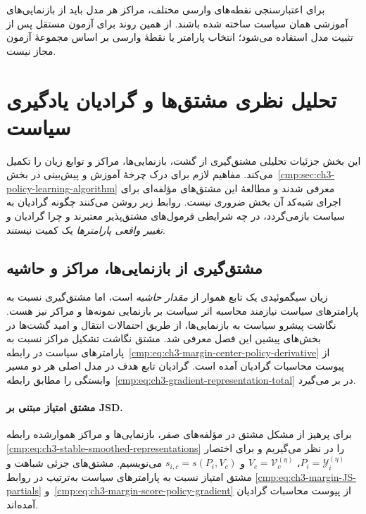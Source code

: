 برای اعتبارسنجی نقطه‌های وارسی مختلف، مراکز هر
مدل باید از بازنمایی‌های آموزشی همان سیاست ساخته
شده باشند. از همین روند برای آزمون مستقل پس از
تثبیت مدل استفاده می‌شود؛ انتخاب پارامتر یا
نقطهٔ وارسی بر اساس مجموعهٔ آزمون مجاز نیست.

\section{تحلیل نظری مشتق‌ها و گرادیان یادگیری سیاست}
\label{cmp:sec:ch3-policy-gradient-theory}
این بخش جزئیات تحلیلی
مشتق‌گیری از گشت، بازنمایی‌ها،
مراکز و توابع زیان را تکمیل می‌کند.
مفاهیم لازم برای درک چرخهٔ آموزش
و پیش‌بینی در
بخش~\ref{cmp:sec:ch3-policy-learning-algorithm}
معرفی شدند و مطالعهٔ این مشتق‌های
مؤلفه‌ای برای اجرای شبه‌کد آن بخش
ضروری نیست. روابط زیر روشن می‌کنند
چگونه گرادیان به سیاست بازمی‌گردد،
در چه شرایطی فرمول‌های مشتق‌پذیر
معتبرند و چرا گرادیان و
\emph{تغییر واقعی پارامترها}
یک کمیت نیستند.

\subsection{مشتق‌گیری از بازنمایی‌ها، مراکز و حاشیه}
\label{cmp:subsec:ch3-margin-policy-derivatives}
زیان سیگموئیدی یک تابع
هموار از \emph{مقدار حاشیه}
است، اما مشتق‌گیری نسبت به
پارامترهای سیاست نیازمند
محاسبه اثر سیاست بر
بازنمایی نمونه‌ها و مراکز
نیز هست. نگاشت پیشرو
سیاست به بازنمایی‌ها،
از طریق احتمالات انتقال
و امید گشت‌ها در بخش‌های
پیشین این فصل معرفی شد.
مشتق نگاشت تشکیل مراکز نسبت به پارامترهای
سیاست در رابطه~\eqref{cmp:eq:ch3-margin-center-policy-derivative}
از پیوست محاسبات گرادیان آمده است. گرادیان
تابع هدف در مدل اصلی هر دو مسیر وابستگی را
مطابق رابطه~\eqref{cmp:eq:ch3-gradient-representation-total}
در بر می‌گیرد.

\paragraph{مشتق امتیاز مبتنی بر JSD.}
برای پرهیز از مشکل مشتق
در مؤلفه‌های صفر،
بازنمایی‌ها و مراکز
هموارشده رابطه
\eqref{cmp:eq:ch3-stable-smoothed-representations}
را در نظر می‌گیریم و
برای اختصار
$P_i=\mathscr Y_i^{(\eta)}$،
$V_c=\mathcal V_c^{(\eta)}$
و $s_{i,c}=s(P_i,V_c)$
می‌نویسیم. مشتق‌های جزئی شباهت و مشتق امتیاز نسبت به
پارامترهای سیاست به‌ترتیب در روابط
\eqref{cmp:eq:ch3-margin-JS-partials}
و~\eqref{cmp:eq:ch3-margin-score-policy-gradient}
از پیوست محاسبات گرادیان آمده‌اند.

